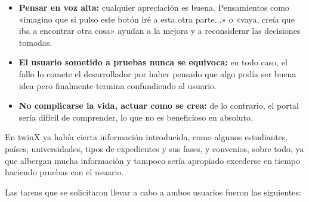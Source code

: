 \begin{itemize}
	\item \textbf{Pensar en voz alta:} cualquier apreciación es buena. Pensamientos como «imagino que si pulso este botón iré a esta otra parte...» o «vaya, creía que iba a encontrar otra cosa» ayudan a la mejora y a reconsiderar las decisiones tomadas.
	\item \textbf{El usuario sometido a pruebas nunca se equivoca:} en todo caso, el fallo lo comete el desarrollador por haber pensado que algo podía ser buena idea pero finalmente termina confundiendo al usuario.
	\item \textbf{No complicarse la vida, actuar como se crea:} de lo contrario, el portal sería difícil de comprender, lo que no es beneficioso en absoluto.	
\end{itemize}

En twinX ya había cierta información introducida, como algunos estudiantes, países, universidades, tipos de expedientes y sus fases, y convenios, sobre todo, ya que albergan mucha información y tampoco sería apropiado excederse en tiempo haciendo pruebas con el usuario.

Las tareas que se solicitaron llevar a cabo a ambos usuarios fueron las siguientes:

